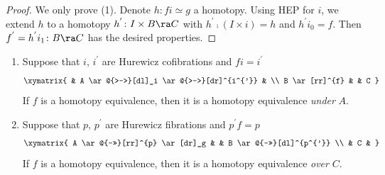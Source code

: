 \begin{proof}
We only prove (1). Denote $h \colon fi \simeq g$ a homotopy. Using HEP for $i$, we extend $h$ to a homotopy $h^{'} \colon I \times B \ra C$ with $h^{'} \comp (I \times i) = h$ and $h^{'}i_0 = f$. Then $f^{'} = h^{'}i_1 \colon B \ra C$ has the desired properties.
\end{proof}

\begin{lem}[A. Dold]
\label{lem:dold}
\mbox{}
\begin{enumerate}
\item
Suppose that $i$, $i^{'}$ are Hurewicz cofibrations and $fi = i^{'}$
\[
\xymatrix{
  & A \ar@{>->}[dl]_i \ar@{>->}[dr]^{i^{'}} & \\
  B \ar[rr]^{f} & & C
}
\]
If $f$ is a homotopy equivalence, then it is a homotopy equivalence {\it under} $A$.
\item
Suppose that $p$, $p^{'}$ are Hurewicz fibrations and $p^{'}f = p$
\[
\xymatrix{
  A \ar@{->>}[rr]^{p} \ar[dr]_g & & B \ar@{->>}[dl]^{p^{'}} \\
  & C &
}
\]
If $f$ is a homotopy equivalence, then it is a homotopy equivalence {\it over} $C$.
\end{enumerate}
\end{lem}

